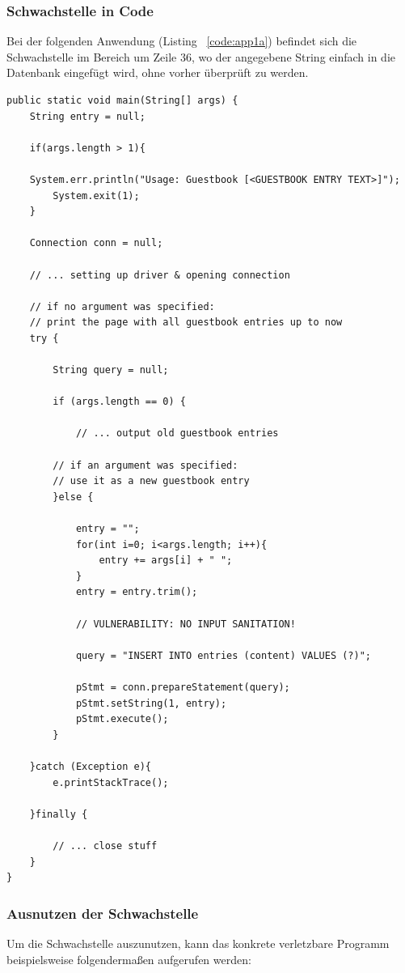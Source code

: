 \documentclass[12pt,a4paper,titlepage,oneside]{scrartcl}
\begin{document}
\subsubsection{Schwachstelle in Code}
Bei der folgenden Anwendung (Listing ~\ref*{code:app1a}) befindet sich die Schwachstelle im Bereich um Zeile 36, wo der angegebene String einfach in die Datenbank eingefügt wird, ohne vorher überprüft zu werden.
\begin{lstlisting}[caption=XSS Schwachstelle,label=code:app1a,style=c]
	public static void main(String[] args) {
	String entry = null;
	
	if(args.length > 1){
	
	System.err.println("Usage: Guestbook [<GUESTBOOK ENTRY TEXT>]");
		System.exit(1);
	}
	
	Connection conn = null;
	
	// ... setting up driver & opening connection
	
	// if no argument was specified:
	// print the page with all guestbook entries up to now
	try {
		
		String query = null;
		
		if (args.length == 0) {

			// ... output old guestbook entries
		
		// if an argument was specified:
		// use it as a new guestbook entry
		}else {
		
			entry = "";
			for(int i=0; i<args.length; i++){
				entry += args[i] + " ";
			}
			entry = entry.trim();
			
			// VULNERABILITY: NO INPUT SANITATION!
			
			query = "INSERT INTO entries (content) VALUES (?)";
			
			pStmt = conn.prepareStatement(query);
			pStmt.setString(1, entry);
			pStmt.execute();
		}
		
	}catch (Exception e){
		e.printStackTrace();
	
	}finally {

		// ... close stuff
	}
}
\end{lstlisting}

\subsubsection{Ausnutzen der Schwachstelle}

Um die Schwachstelle auszunutzen, kann das konkrete verletzbare Programm beispielsweise folgendermaßen aufgerufen werden:
\end{document}
